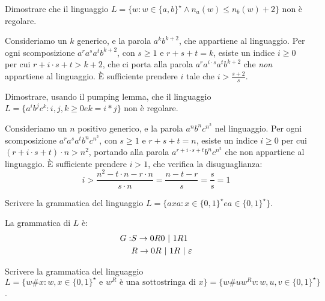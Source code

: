 \begin{esercizio}
Dimostrare che il linguaggio $L = \{ w : w \in \{a,b\}^{\star} \land n_a(w) \le n_b(w) + 2 \}$ non \`e regolare.
\end{esercizio}

Consideriamo un $k$ generico, e la parola $a^k b^{k+2}$, che appartiene al linguaggio.
Per ogni scomposizione $a^r a^s a^t b^{k+2}$, con $s \ge 1$ e $r + s + t = k$, esiste un indice $i \ge 0$ per cui $r + i \cdot s + t > k + 2$, che ci porta alla parola $a^r a^{i \cdot s} a^t b^{k+2}$ che \emph{non} appartiene al linguaggio.
\`E sufficiente prendere $i$ tale che $i > \frac{s + 2}{s}$.

\begin{esercizio}
Dimostrare, usando il pumping lemma, che il linguaggio $L = \{ a^i b^j c^k : i,j,k \ge 0 e k = i * j \}$ non \`e regolare.
\end{esercizio}

Consideriamo un $n$ positivo generico, e la parola $a^n b^n c^{n^2}$ nel linguaggio.
Per ogni scomposizione $a^r a^s a^t b^n c^{n^2}$, con $s \ge 1$ e $r + s + t = n$, esiste un indice $i \ge 0$ per cui $(r + i \cdot s + t) \cdot n > n^2$, portando alla parola $a^{r + i \cdot s + t} b^n c^{n^2}$ che non appartiene al linguaggio.
\`E sufficiente prendere $i > 1$, che verifica la disuguaglianza:
\[
i > \frac{n^2 - t \cdot n - r \cdot n}{s \cdot n} = \frac{n - t - r}{s} = \frac{s}{s} = 1
\]

\begin{esercizio}
Scrivere la grammatica del linguaggio $L = \{ a x a : x \in \{0,1\}^{\star} e a \in \{0,1\}^{\star} \}$.
\end{esercizio}

La grammatica di $L$ \`e:
\begin{align*}
G :& S \to 0 R 0 \ | \  1 R 1 \\
& R \to 0R \ | \  1R \ | \  \varepsilon
\end{align*}

\begin{esercizio}
Scrivere la grammatica del linguaggio $L = \{ w \# x : w, x \in \{0,1\}^{\star} \text{ e } w^R \text{ \`e una sottostringa di } x \} = \{ w \# u w^R v : w, u, v \in \{0,1\}^{\star} \}$.
\end{esercizio}
